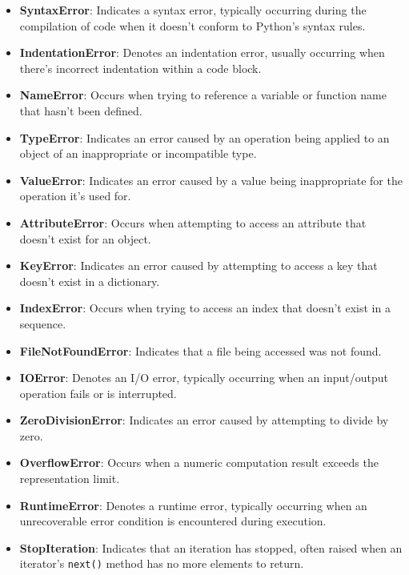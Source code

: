 \documentclass[12pt, a4paper, oneside, justified]{article}
\begin{document}
\begin{itemize}
    \item \textbf{SyntaxError}: Indicates a syntax error, typically occurring during the compilation of code when it doesn't conform to Python's syntax rules. \\
    \item \textbf{IndentationError}: Denotes an indentation error, usually occurring when there's incorrect indentation within a code block. \\
    \item \textbf{NameError}: Occurs when trying to reference a variable or function name that hasn't been defined. \\
    \item \textbf{TypeError}: Indicates an error caused by an operation being applied to an object of an inappropriate or incompatible type. \\
    \item \textbf{ValueError}: Indicates an error caused by a value being inappropriate for the operation it's used for. \\
    \item \textbf{AttributeError}: Occurs when attempting to access an attribute that doesn't exist for an object. \\
    \item \textbf{KeyError}: Indicates an error caused by attempting to access a key that doesn't exist in a dictionary. \\
    \item \textbf{IndexError}: Occurs when trying to access an index that doesn't exist in a sequence. \\
    \item \textbf{FileNotFoundError}: Indicates that a file being accessed was not found. \\
    \item \textbf{IOError}: Denotes an I/O error, typically occurring when an input/output operation fails or is interrupted. \\
    \item \textbf{ZeroDivisionError}: Indicates an error caused by attempting to divide by zero. \\
    \item \textbf{OverflowError}: Occurs when a numeric computation result exceeds the representation limit. \\
    \item \textbf{RuntimeError}: Denotes a runtime error, typically occurring when an unrecoverable error condition is encountered during execution. \\
    \item \textbf{StopIteration}: Indicates that an iteration has stopped, often raised when an iterator's \texttt{next()} method has no more elements to return.
\end{itemize}
\end{document}
